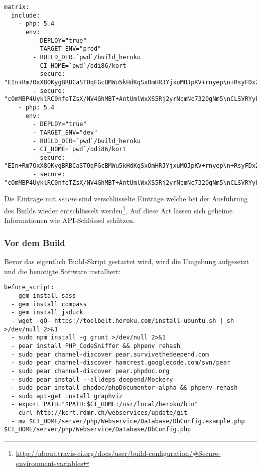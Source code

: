 \lstset{language=XML}
\begin{lstlisting}[float, caption=Zusätzliche Builds für Heroku, label=travis-yml-heroku]
matrix:
  include:
    - php: 5.4
      env:
        - DEPLOY="true"
        - TARGET_ENV="prod"
        - BUILD_DIR=`pwd`/build_heroku
        - CI_HOME=`pwd`/odi86/kort
        - secure: "EIn+Rm7OxX8OKygBRBCaSTOqFGcBMWu5kHdKqSxOmHRJYjxuMOJpKV+rnyep\n+RsyFDx2Z9yKlqRRS4cpZh7M6wwC63EV46+7aWtzzTjnbMZfVzLQA9EmaEU4\nYMsKGtpQk2mhvaNKd3UbEpDl0Zq74NnAY0zipx0l02UymcFnZEc="
        - secure: "cOmMBP4UyklRC0nfeTZsX/NV4GhMBT+AntUmlWxXS5Rj2yrNcmNc7320gNm5\nCLSVRYyk7/8feyUEMznWrUn/62htZp0tEBAWtXg86dgIZgH4HPy9l2pKuSsH\nxZTHgjUJI7JOuyLG4ID9D5maVLE35UWag/NEtcRVy5QXLZOrs0M="
    - php: 5.4
      env:
        - DEPLOY="true"
        - TARGET_ENV="dev"
        - BUILD_DIR=`pwd`/build_heroku
        - CI_HOME=`pwd`/odi86/kort
        - secure: "EIn+Rm7OxX8OKygBRBCaSTOqFGcBMWu5kHdKqSxOmHRJYjxuMOJpKV+rnyep\n+RsyFDx2Z9yKlqRRS4cpZh7M6wwC63EV46+7aWtzzTjnbMZfVzLQA9EmaEU4\nYMsKGtpQk2mhvaNKd3UbEpDl0Zq74NnAY0zipx0l02UymcFnZEc="
        - secure: "cOmMBP4UyklRC0nfeTZsX/NV4GhMBT+AntUmlWxXS5Rj2yrNcmNc7320gNm5\nCLSVRYyk7/8feyUEMznWrUn/62htZp0tEBAWtXg86dgIZgH4HPy9l2pKuSsH\nxZTHgjUJI7JOuyLG4ID9D5maVLE35UWag/NEtcRVy5QXLZOrs0M="
\end{lstlisting}

Die Einträge mit \emph{secure} sind verschlüsselte Einträge welche bei der Ausführung des Builds wieder entschlüsselt werden\footnote{\url{http://about.travis-ci.org/docs/user/build-configuration/\#Secure-environment-variables}}.
Auf diese Art lassen sich geheime Informationen wie API-Schlüssel schützen.

\subsubsection{Vor dem Build}
Bevor das eigentlich Build-Skript gestartet wird, wird die Umgebung aufgesetzt und die benötigte Software installiert:

\lstset{language=XML}
\begin{lstlisting}[float, caption=before\_script in .travis.yml, label=travis-yml-before-script]
before_script:
  - gem install sass
  - gem install compass
  - gem install jsduck
  - wget -qO- https://toolbelt.heroku.com/install-ubuntu.sh | sh >/dev/null 2>&1
  - sudo npm install -g grunt >/dev/null 2>&1
  - pear install PHP_CodeSniffer && phpenv rehash
  - sudo pear channel-discover pear.survivethedeepend.com
  - sudo pear channel-discover hamcrest.googlecode.com/svn/pear
  - sudo pear channel-discover pear.phpdoc.org
  - sudo pear install --alldeps deepend/Mockery
  - sudo pear install phpdoc/phpDocumentor-alpha && phpenv rehash
  - sudo apt-get install graphviz
  - export PATH="$PATH:$CI_HOME:/usr/local/heroku/bin"
  - curl http://kort.rdmr.ch/webservices/update/git
  - mv $CI_HOME/server/php/Webservice/Database/DbConfig.example.php $CI_HOME/server/php/Webservice/Database/DbConfig.php
\end{lstlisting}

